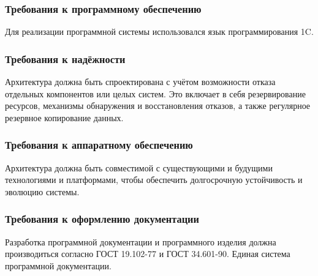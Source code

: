 \subsubsection{Требования к программному обеспечению}
Для реализации программной системы использовался язык программирования 1C. 

\subsubsection{Требования к надёжности}
Архитектура должна быть спроектирована с учётом возможности отказа отдельных компонентов или целых систем. Это включает в себя резервирование ресурсов, механизмы обнаружения и восстановления отказов, а также регулярное резервное копирование данных.

\subsubsection{Требования к аппаратному обеспечению}

Архитектура должна быть совместимой с существующими и будущими технологиями и платформами, чтобы обеспечить долгосрочную устойчивость и эволюцию системы.

\subsubsection{Требования к оформлению документации}

Разработка программной документации и программного изделия должна производиться согласно ГОСТ 19.102-77 и ГОСТ 34.601-90. Единая система программной документации.
